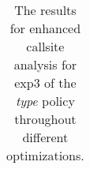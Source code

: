 \begin{table}[!htbp]
{\begin{tabular}{l|c|c|c}
    	\end{tabular}

%
%	
%
%
%
%	
%	
%	
%
%
%
}
		\caption {The results for enhanced callsite analysis for exp3 of the \textit{type} policy throughout different optimizations.}
		\label{tbl:CSexp34TYPE}
\end{table}
\newpage

